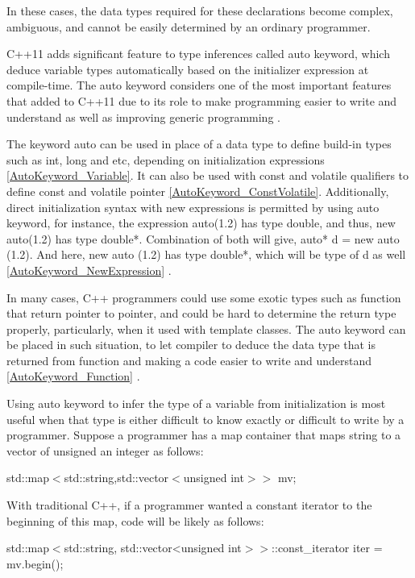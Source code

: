 \documentclass[11pt]{report}
\begin{document}
In these cases, the data types required for these declarations become complex, ambiguous, and cannot be easily determined by an ordinary programmer.


C++11 adds significant feature to type inferences called auto keyword, which deduce variable types automatically based on the initializer expression at compile-time.  The auto keyword considers one of the most important features that added to C++11 due to its role to make programming easier to write and understand as well as improving generic programming \cite{Gregorie:professionalcpp}.


The keyword auto can be used in place of a data type to define build-in types such as int, long and etc, depending on initialization expressions \ref{AutoKeyword_Variable}. It can also be used with const and volatile qualifiers to define const and volatile pointer \ref{AutoKeyword_ConstVolatile}. Additionally, direct initialization syntax with new expressions is permitted by using auto keyword, for instance, the expression auto(1.2) has type double, and thus, new auto(1.2) has type double*. Combination of both will give, auto* d = new auto (1.2). And here, new auto (1.2) has type double*, which will be type of d as well \ref{AutoKeyword_NewExpression} \cite{Stroustrup:2012:Cpp11}.

In many cases, C++ programmers could use some exotic types such as function that return pointer to pointer, and could be hard to determine the return type properly, particularly, when it used with template classes. The auto keyword can be placed in such situation, to let compiler to deduce the data type that is returned from function and making a code easier to write and understand \ref{AutoKeyword_Function} \cite{Overland:2011:CWF}.


Using auto keyword to infer the type of a variable from initialization is most useful when that type is either difficult to know exactly or difficult to write by a programmer. Suppose a programmer has a map container that maps string to a vector of unsigned an integer as follows: 

\begin{center}
std::map$<$std::string,std::vector$<$unsigned int$>>$ mv;
\end{center}

With traditional C++, if a programmer wanted a constant iterator to the beginning of this map, code will be likely as follows:

\begin{center}
std::map$<$std::string, std::vector<unsigned int$>>$::const\_iterator iter = mv.begin();
\end{center}
\end{document}
